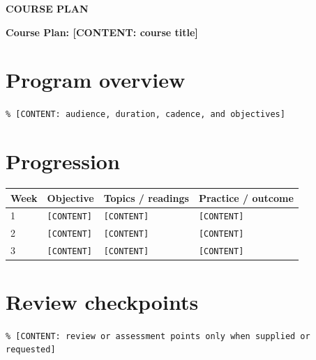 \documentclass[11pt,a4paper]{scrartcl}
\begin{document}
{\small\sffamily\bfseries\color{Muted}COURSE PLAN\par}
{\Huge\bfseries Course Plan: [CONTENT: course title]\par}

\section{Program overview}
\texttt{\% [CONTENT: audience, duration, cadence, and objectives]}

\section{Progression}
\begin{longtable}{@{}p{.10\linewidth}p{.24\linewidth}p{.24\linewidth}p{.30\linewidth}@{}}
\toprule
Week & Objective & Topics / readings & Practice / outcome \\
\midrule
\endhead
1 & \texttt{[CONTENT]} & \texttt{[CONTENT]} & \texttt{[CONTENT]} \\
2 & \texttt{[CONTENT]} & \texttt{[CONTENT]} & \texttt{[CONTENT]} \\
3 & \texttt{[CONTENT]} & \texttt{[CONTENT]} & \texttt{[CONTENT]} \\
\bottomrule
\end{longtable}

\section{Review checkpoints}
\texttt{\% [CONTENT: review or assessment points only when supplied or requested]}
\end{document}
